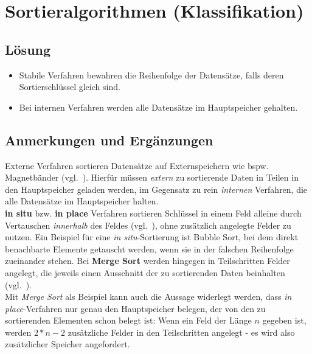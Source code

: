 \chapter{Sortieralgorithmen (Klassifikation)}

\section*{Lösung}

\begin{itemize}
    \item Stabile Verfahren bewahren die Reihenfolge der Datensätze, falls deren Sortierschlüssel gleich sind.
    \item Bei internen Verfahren werden alle Datensätze im Hauptspeicher gehalten.
\end{itemize}


\section*{Anmerkungen und Ergänzungen}

Externe Verfahren sortieren Datensätze auf Externspeichern wie bspw. Magnetbänder (vgl.~\cite[141 ff.]{OW17b}). Hierfür müssen \textit{extern} zu sortierende Daten in Teilen in den Hauptspeicher geladen werden, im Gegensatz zu rein \textit{internen} Verfahren, die alle Datensätze im Hauptspeicher halten. \\

\textbf{in situ} bzw. \textbf{in place} Verfahren sortieren Schlüssel in einem Feld alleine durch Vertauschen \textit{innerhalb} des Feldes (vgl.~\cite[169]{GD18e}), ohne zusätzlich angelegte Felder zu nutzen.
Ein Beispiel für eine \textit{in situ}-Sortierung ist Bubble Sort, bei dem direkt benachbarte Elemente getauscht werden, wenn sie in der falschen Reihenfolge zueinander stehen.
Bei \textbf{Merge Sort} werden hingegen in Teilschritten Felder angelegt, die jeweils einen Ausschnitt der zu sortierenden Daten beinhalten (vgl.~\cite[112 ff.]{OW17b}). \\

Mit \textit{Merge Sort} als Beispiel kann auch die Aussage widerlegt werden, dass \textit{in place}-Verfahren nur genau den Hauptspeicher belegen, der von den zu sortierenden Elementen schon belegt ist: Wenn ein Feld der Länge $n$ gegeben ist, werden $2 * n - 2$ zusätzliche Felder in den Teilschritten angelegt - es wird also zusätzlicher Speicher angefordert.
\\

